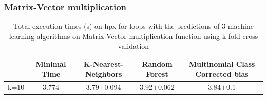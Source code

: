 \subsubsection{Matrix-Vector multiplication}

\begin{table}[h]
	\centering
	\caption{Total execution times (s) on hpx for-loops with the predictions of 3 machine learning algorithms on Matrix-Vector multiplication function using k-fold cross validation}
	\label{my-label}
	\begin{tabular}{|c|c|c|c|c|}
		\hline
		& Minimal Time&K-Nearest-Neighbors & Random Forest &Multinomial Class Corrected bias\\ \hline
		k=10  &3.774&
		3.79$\pm$0.094       & 3.92$\pm$0.062&3.84$\pm$0.1 \\ \hline
	\end{tabular}
\end{table}

